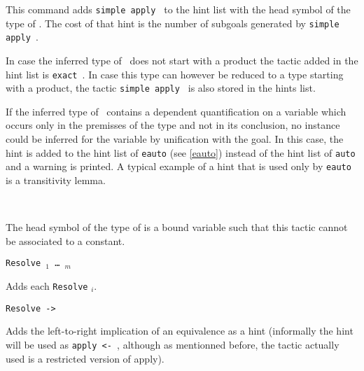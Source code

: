 \begin{coq_example*}
\begin{itemize}
  This command adds {\tt simple apply {\term}} to the hint list
  with the head symbol of the type of \term. The cost of that hint is
  the number of subgoals generated by {\tt simple apply {\term}}.

  In case the inferred type of \term\ does not start with a product
  the tactic added in the hint list is {\tt exact {\term}}.
  In case
  this type can however be reduced to a type starting with a product,
  the tactic {\tt simple apply {\term}} is also stored in the hints list.

  If the inferred type of \term\ contains a dependent quantification
  on a variable which occurs only in the premisses of the type and not
  in its conclusion, no instance could be inferred for the variable by
  unification with the goal. In this case, the hint is added to the
  hint list of {\tt eauto} (see \ref{eauto}) instead of the hint list
  of {\tt auto} and a warning is printed. A typical example of a hint
  that is used only by \texttt{eauto} is a transitivity lemma.

  \begin{ErrMsgs}

  \item \term\ 

    The head symbol of the type of {\term} is a bound variable such
    that this tactic cannot be associated to a constant.


  \end{ErrMsgs}

  \begin{Variants}

  \item {\tt Resolve \term$_1$ \mbox{\dots} \term$_m$}

    Adds each \texttt{Resolve} {\term$_i$}.

  \item {\tt Resolve -> \term}

    Adds the left-to-right implication of an equivalence as a hint
    (informally the hint will be used as {\tt apply <- \term},
    although as mentionned before, the tactic actually used is
    a restricted version of apply).


\end{Variants}
\end{itemize}
\end{coq_example*}
